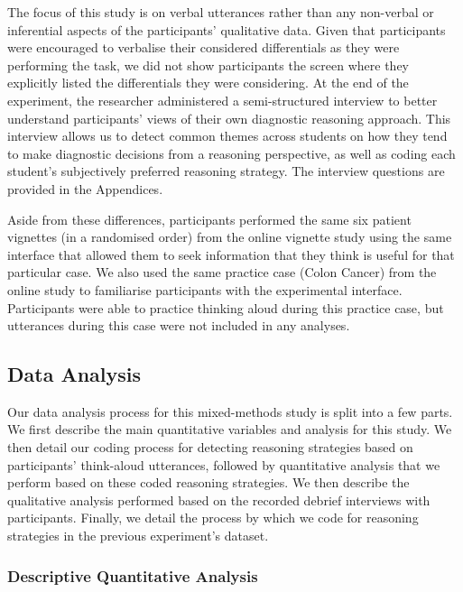 \documentclass[a4paper, nobind]{templates/ociamthesis}
\begin{document}
\hfill\break
The focus of this study is on verbal utterances rather than any non-verbal or inferential aspects of the participants' qualitative data. Given that participants were encouraged to verbalise their considered differentials as they were performing the task, we did not show participants the screen where they explicitly listed the differentials they were considering. At the end of the experiment, the researcher administered a semi-structured interview to better understand participants' views of their own diagnostic reasoning approach. This interview allows us to detect common themes across students on how they tend to make diagnostic decisions from a reasoning perspective, as well as coding each student's subjectively preferred reasoning strategy. The interview questions are provided in the Appendices.

\hfill\break
Aside from these differences, participants performed the same six patient vignettes (in a randomised order) from the online vignette study using the same interface that allowed them to seek information that they think is useful for that particular case. We also used the same practice case (Colon Cancer) from the online study to familiarise participants with the experimental interface. Participants were able to practice thinking aloud during this practice case, but utterances during this case were not included in any analyses.

\subsection*{Data Analysis}\label{data-analysis-1}

Our data analysis process for this mixed-methods study is split into a few parts. We first describe the main quantitative variables and analysis for this study. We then detail our coding process for detecting reasoning strategies based on participants' think-aloud utterances, followed by quantitative analysis that we perform based on these coded reasoning strategies. We then describe the qualitative analysis performed based on the recorded debrief interviews with participants. Finally, we detail the process by which we code for reasoning strategies in the previous experiment's dataset.

\subsubsection*{Descriptive Quantitative Analysis}\label{descriptive-quantitative-analysis}
\end{document}
